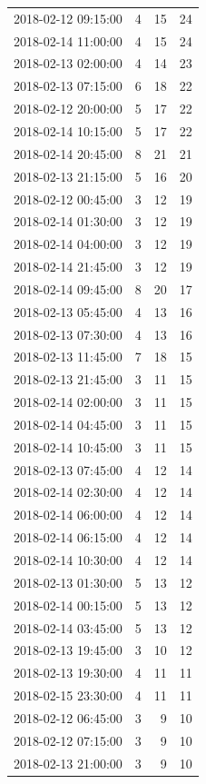 \begin{tabular}{lrrr}
2018-02-12 09:15:00 & 4 & 15 & 24 \\
2018-02-14 11:00:00 & 4 & 15 & 24 \\
2018-02-13 02:00:00 & 4 & 14 & 23 \\
2018-02-13 07:15:00 & 6 & 18 & 22 \\
2018-02-12 20:00:00 & 5 & 17 & 22 \\
2018-02-14 10:15:00 & 5 & 17 & 22 \\
2018-02-14 20:45:00 & 8 & 21 & 21 \\
2018-02-13 21:15:00 & 5 & 16 & 20 \\
2018-02-12 00:45:00 & 3 & 12 & 19 \\
2018-02-14 01:30:00 & 3 & 12 & 19 \\
2018-02-14 04:00:00 & 3 & 12 & 19 \\
2018-02-14 21:45:00 & 3 & 12 & 19 \\
2018-02-14 09:45:00 & 8 & 20 & 17 \\
2018-02-13 05:45:00 & 4 & 13 & 16 \\
2018-02-13 07:30:00 & 4 & 13 & 16 \\
2018-02-13 11:45:00 & 7 & 18 & 15 \\
2018-02-13 21:45:00 & 3 & 11 & 15 \\
2018-02-14 02:00:00 & 3 & 11 & 15 \\
2018-02-14 04:45:00 & 3 & 11 & 15 \\
2018-02-14 10:45:00 & 3 & 11 & 15 \\
2018-02-13 07:45:00 & 4 & 12 & 14 \\
2018-02-14 02:30:00 & 4 & 12 & 14 \\
2018-02-14 06:00:00 & 4 & 12 & 14 \\
2018-02-14 06:15:00 & 4 & 12 & 14 \\
2018-02-14 10:30:00 & 4 & 12 & 14 \\
2018-02-13 01:30:00 & 5 & 13 & 12 \\
2018-02-14 00:15:00 & 5 & 13 & 12 \\
2018-02-14 03:45:00 & 5 & 13 & 12 \\
2018-02-13 19:45:00 & 3 & 10 & 12 \\
2018-02-13 19:30:00 & 4 & 11 & 11 \\
2018-02-15 23:30:00 & 4 & 11 & 11 \\
2018-02-12 06:45:00 & 3 & 9 & 10 \\
2018-02-12 07:15:00 & 3 & 9 & 10 \\
2018-02-13 21:00:00 & 3 & 9 & 10 \\

\end{tabular}
